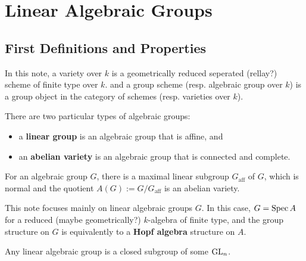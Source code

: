 \section{Linear Algebraic Groups}

\subsection{First Definitions and Properties}
In this note, a variety over $k$ is
a geometrically reduced seperated (rellay?) scheme of finite type over $k$.
and a group scheme (resp. algebraic group over $k$)
is a group object in the category of schemes
(resp.\! varieties over $k$).

There are two particular types of algebraic groups:
\begin{itemize}
    \item a \textbf{linear group} is an algebraic group that is affine, and
    \item an \textbf{abelian variety} is an algebraic group that is connected and complete.
\end{itemize}

\begin{theorem}[Chevalley]
    For an algebraic group $G$,
    there is a maximal linear subgroup $G_\mathrm{aff}$ of $G$, which is normal and the quotient $A(G) := G/G_{\mathrm{aff}}$ is an abelian variety.
\end{theorem}

This note focuses mainly on linear algebraic groups $G$.
In this case, $G = \operatorname{Spec} A$ for a reduced (maybe geometrically?) $k$-algebra of finite type, and the group structure on $G$ is equivalently to a \textbf{Hopf algebra} structure on $A$.

\begin{theorem}
    Any linear algebraic group is a closed subgroup of some $\operatorname{GL}_n$.
\end{theorem}